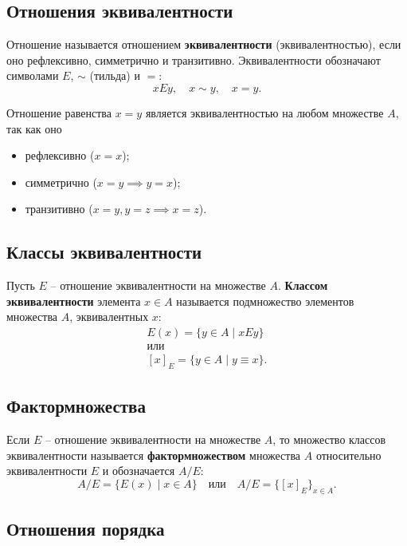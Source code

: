 \subsection{Отношения эквивалентности}

Отношение называется отношением \textbf{эквивалентности} (эквивалентностью), если оно рефлексивно, симметрично и транзитивно. Эквивалентности обозначают символами \(E\), \(\sim\) (тильда) и \(=\):
\[
    xEy,
    \quad
    x \sim y,
    \quad
    x = y.
\]

\begin{example*}
    Отношение равенства \(x = y\) является эквивалентностью на любом множестве \(A\), так как оно
    \begin{itemize}
        \item рефлексивно (\(x = x\));
        \item симметрично (\(x = y \implies y = x\));
        \item транзитивно (\(x = y, y = z \implies x = z\)).
    \end{itemize}
\end{example*}


\subsection{Классы эквивалентности}

Пусть \(E\) -- отношение эквивалентности на множестве \(A\). \textbf{Классом эквивалентности} элемента \(x \in A\) называется подмножество элементов множества \(A\), эквивалентных \(x\):
\begin{gather*}
    E(x) = \{y \in A \mid xEy\}
    \\ \text{или} \\
    [x]_E = \{y \in A \mid y \equiv x\}.
\end{gather*}

\subsection{Фактормножества}

Если \(E\) -- отношение эквивалентности на множестве \(A\), то множество классов эквивалентности называется \textbf{фактормножеством} множества \(A\) относительно эквивалентности \(E\) и обозначается \(A \slash E\):
\[
    A \slash E = \{E(x) \mid x \in A\}
    \quad
    \text{или}
    \quad
    A \slash E = \{[x]_E\}_{x \in A}.
\]

\subsection{Отношения порядка}

